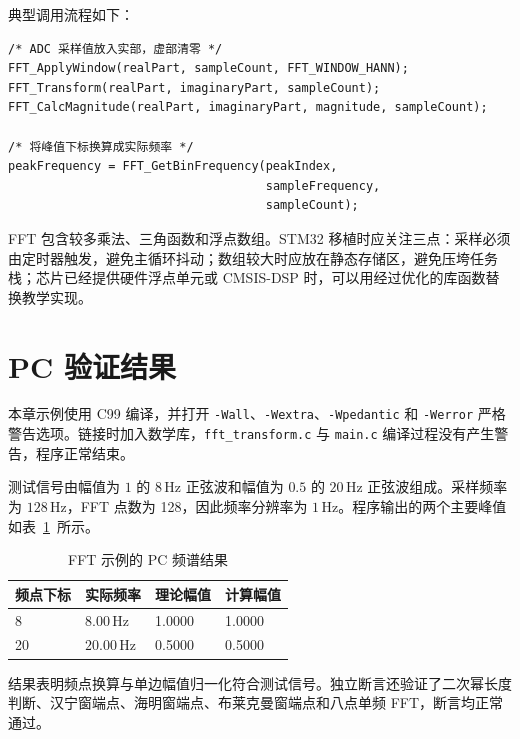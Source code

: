 典型调用流程如下：

\begin{lstlisting}[style=c]
/* ADC 采样值放入实部，虚部清零 */
FFT_ApplyWindow(realPart, sampleCount, FFT_WINDOW_HANN);
FFT_Transform(realPart, imaginaryPart, sampleCount);
FFT_CalcMagnitude(realPart, imaginaryPart, magnitude, sampleCount);

/* 将峰值下标换算成实际频率 */
peakFrequency = FFT_GetBinFrequency(peakIndex,
                                    sampleFrequency,
                                    sampleCount);
\end{lstlisting}

FFT 包含较多乘法、三角函数和浮点数组。STM32 移植时应关注三点：采样必须由定时器触发，避免主循环抖动；数组较大时应放在静态存储区，避免压垮任务栈；芯片已经提供硬件浮点单元或 CMSIS-DSP 时，可以用经过优化的库函数替换教学实现。

\section{PC 验证结果}

本章示例使用 C99 编译，并打开 \texttt{-Wall}、\texttt{-Wextra}、\texttt{-Wpedantic} 和 \texttt{-Werror} 严格警告选项。链接时加入数学库，\texttt{fft\_transform.c} 与 \texttt{main.c} 编译过程没有产生警告，程序正常结束。

测试信号由幅值为 $1$ 的 $8\,\mathrm{Hz}$ 正弦波和幅值为 $0.5$ 的 $20\,\mathrm{Hz}$ 正弦波组成。采样频率为 $128\,\mathrm{Hz}$，FFT 点数为 128，因此频率分辨率为 $1\,\mathrm{Hz}$。程序输出的两个主要峰值如表~\ref{tab:fft-pc-result}~所示。

\begin{table}[htbp]
\centering
\caption{FFT 示例的 PC 频谱结果} \label{tab:fft-pc-result}
\begin{tabular}{llll}
\toprule
频点下标 & 实际频率 & 理论幅值 & 计算幅值 \\
\midrule
8 & $8.00\,\mathrm{Hz}$ & 1.0000 & 1.0000 \\
20 & $20.00\,\mathrm{Hz}$ & 0.5000 & 0.5000 \\
\bottomrule
\end{tabular}
\end{table}

结果表明频点换算与单边幅值归一化符合测试信号。独立断言还验证了二次幂长度判断、汉宁窗端点、海明窗端点、布莱克曼窗端点和八点单频 FFT，断言均正常通过。

